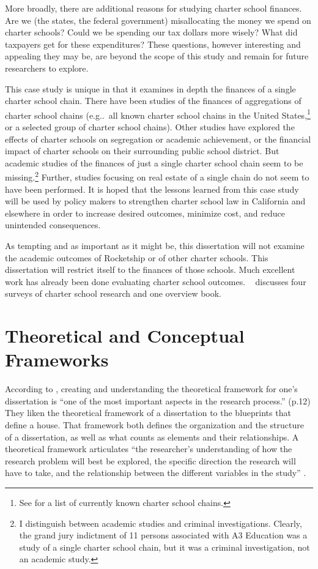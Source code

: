 More broadly, there are additional reasons for studying charter school finances. Are we (the states, the federal government) misallocating the money we spend on charter schools? Could we be spending our tax dollars more wisely? What did taxpayers get for these expenditures? These questions, however interesting and appealing they may be, are beyond the scope of this study and remain for future researchers to explore.

This case study is unique in that it examines in depth the finances of a single charter school chain. There have been studies of the finances of aggregations of charter school chains (e.g..~all known charter school chains in the United States,\footnote{See \textcite{Miron.etal2021} for a list of currently known charter school chains.} or a selected group of charter school chains). Other studies have explored the effects of charter schools on segregation or academic achievement, or the financial impact of charter schools on their surrounding public school district. But academic studies of the finances of just a single charter school chain seem to be missing.\footnote{I distinguish between academic studies and criminal investigations. Clearly, the grand jury indictment of 11 persons associated with A3 Education was a study of a single charter school chain, but it was a criminal investigation, not an academic study.} Further, studies focusing on real estate of a single chain do not seem to have been performed. It is hoped that the lessons learned from this case study will be used by policy makers to strengthen charter school law in California and elsewhere in order to increase desired outcomes, minimize cost, and reduce unintended consequences.

As tempting and as important as it might be, this dissertation will not examine the academic outcomes of Rocketship or of other charter schools. This dissertation will restrict itself to the finances of those schools. Much excellent work has already been done evaluating charter school outcomes. ~ discusses four surveys of charter school research and one overview book. 

\section{Theoretical and Conceptual Frameworks}\indent

According to \textcite{Grant.Osanloo2014}, creating and understanding the theoretical framework for one's dissertation is ``one of the most important aspects in the research process.'' (p.12) They liken the theoretical framework of a dissertation to the blueprints that define a house. That framework both defines the organization and the structure of a dissertation, as well as what counts as elements and their relationships. A theoretical framework articulates ``the researcher's understanding of how the research problem will best be explored, the specific direction the research will have to take, and the relationship between the different variables in the study'' \parencite[16–17]{Grant.Osanloo2014}. %

